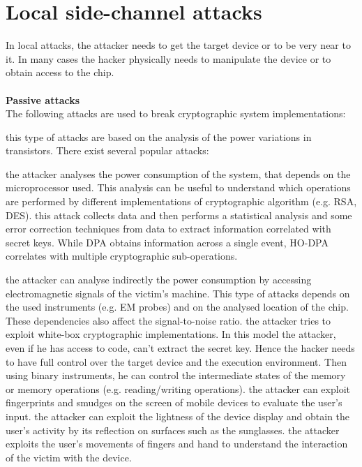\section{Local side-channel attacks}
In local attacks, the attacker needs to get the target device or to be very near to it. In many cases the hacker physically needs to manipulate the device or to obtain access to the chip.\\\\
\textbf{Passive attacks}\\
The following attacks are used to break cryptographic system implementations:
\begin{itemize}
{this type of attacks are based on the analysis of the power variations in transistors. There exist several popular attacks\cite{intro_DPA}:
\begin{itemize}
{the attacker analyses the power consumption of the system, that depends on the microprocessor used. This analysis can be useful to understand which operations are performed by different implementations of cryptographic algorithm (e.g. RSA, DES).}
{this attack collects data and then performs a statistical analysis and some error correction techniques from data to extract information correlated with secret keys.}
{While DPA obtains information across a single event, HO-DPA correlates with multiple cryptographic sub-operations.}
\end{itemize}}
{the attacker can analyse indirectly the power consumption by accessing electromagnetic signals of the victim's machine. This type of attacks depends on the used instruments (e.g. EM probes) and on the analysed location of the chip. These dependencies also affect the signal-to-noise ratio.}
{the attacker tries to exploit white-box cryptographic implementations. In this model the attacker, even if he has access to code, can't extract the secret key. Hence the hacker needs to have full control over the target device and the execution environment. Then using binary instruments, he can control the intermediate states of the memory or memory operations (e.g. reading/writing operations)\cite{side_DCA}.}
{the attacker can exploit fingerprints and smudges on the screen of mobile devices to evaluate the user's input.}
{the attacker can exploit the lightness of the device display and obtain the user's activity by its reflection on surfaces such as the sunglasses.}
{the attacker exploits the user's movements of fingers and hand to understand the interaction of the victim with the device.}
\end{itemize}
